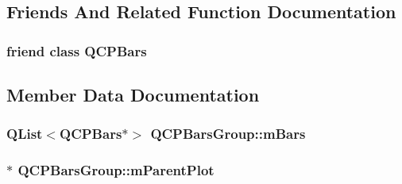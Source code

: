 \subsection{Friends And Related Function Documentation}
\hypertarget{class_q_c_p_bars_group_a721b87c7cdb8e83a90d77fc8a22e7195}{}
\subsubsection[{Q\+C\+P\+Bars}]{\setlength{\rightskip}{0pt plus 5cm}friend class {\bf Q\+C\+P\+Bars}\hspace{0.3cm}{\ttfamily [friend]}}\label{class_q_c_p_bars_group_a721b87c7cdb8e83a90d77fc8a22e7195}


\subsection{Member Data Documentation}
\hypertarget{class_q_c_p_bars_group_affdb1e9233c277ff5a4c0a1121cf1fc0}{}
\subsubsection[{m\+Bars}]{\setlength{\rightskip}{0pt plus 5cm}Q\+List$<${\bf Q\+C\+P\+Bars}$\ast$$>$ Q\+C\+P\+Bars\+Group\+::m\+Bars\hspace{0.3cm}{\ttfamily [protected]}}\label{class_q_c_p_bars_group_affdb1e9233c277ff5a4c0a1121cf1fc0}
\hypertarget{class_q_c_p_bars_group_a973d408cfbf88db95115aec71877f9e7}{}
\subsubsection[{m\+Parent\+Plot}]{$\ast$ Q\+C\+P\+Bars\+Group\+::m\+Parent\+Plot\hspace{0.3cm}{\ttfamily [protected]}}\label{class_q_c_p_bars_group_a973d408cfbf88db95115aec71877f9e7}
\hypertarget{class_q_c_p_bars_group_a56471d7f548ca6141b7a5bf9629f7ece}{}
